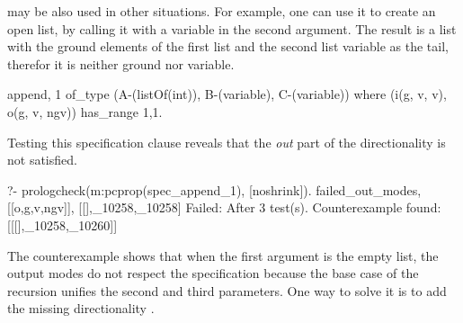 \documentclass[11pt,twoside]{article}
\begin{document}
may be %
also
used in other situations.
%
For example, one can use it to create an open list, by %
calling it with a variable in the second argument.
%
The result is a list with the ground elements of the first list and the
second list variable as the tail, therefor it is neither ground nor
variable.
%
\begin{yapcode}
 {append, 1} of_type (A-(listOf(int)), B-(variable), C-(variable))
   where (i(g, v, v), o(g, v, ngv))  has_range {1,1}.
\end{yapcode}
%
Testing this specification clause reveals that the \emph{out} part of
the directionality is not satisfied.
\begin{yapcode}
  ?- prologcheck(m:pcprop(spec_append_1), [noshrink]).
 {failed_out_modes,[[o,g,v,ngv]], [[],_10258,_10258]}
 Failed: After 3 test(s).
 Counterexample found: [[[],_10258,_10260]] 
\end{yapcode}
%
The counterexample shows that when the first argument is the empty
list, %
the output modes do not respect %
the specification %
because
the base case of the recursion
unifies the second and third parameters.
%
One way to solve it 
is to add the missing directionality .
%



\end{document}
